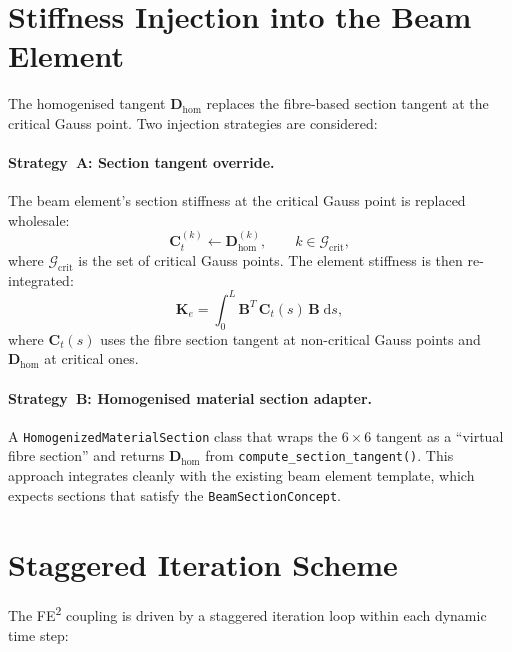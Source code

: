 \section{Stiffness Injection into the Beam Element}
\label{sec:fe2-injection}

The homogenised tangent $\mathbf{D}_{\text{hom}}$ replaces the
fibre-based section tangent at the critical Gauss point.  Two
injection strategies are considered:

\paragraph{Strategy~A: Section tangent override.}
The beam element's section stiffness at the critical Gauss point is
replaced wholesale:
\begin{equation}
  \mathbf{C}_t^{(k)} \leftarrow \mathbf{D}_{\text{hom}}^{(k)},
  \qquad k \in \mathcal{G}_{\text{crit}},
\end{equation}
where $\mathcal{G}_{\text{crit}}$ is the set of critical Gauss points.
The element stiffness is then re-integrated:
\begin{equation}
  \mathbf{K}_e = \int_0^L
    \mathbf{B}^T \, \mathbf{C}_t(s) \, \mathbf{B} \; \mathrm{d}s,
\end{equation}
where $\mathbf{C}_t(s)$ uses the fibre section tangent at non-critical
Gauss points and $\mathbf{D}_{\text{hom}}$ at critical ones.

\paragraph{Strategy~B: Homogenised material section adapter.}
A \texttt{HomogenizedMaterialSection} class that wraps the
$6 \times 6$ tangent as a ``virtual fibre section'' and returns
$\mathbf{D}_{\text{hom}}$ from \texttt{compute\_section\_tangent()}.
This approach integrates cleanly with the existing beam element
template, which expects sections that satisfy the
\texttt{BeamSectionConcept}.


\section{Staggered Iteration Scheme}
\label{sec:fe2-stagger}

The FE\textsuperscript{2} coupling is driven by a staggered iteration
loop within each dynamic time step:

